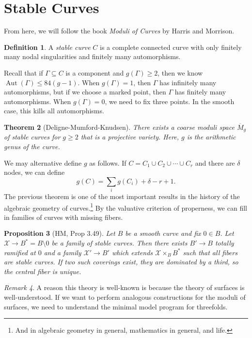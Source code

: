 \documentclass[leqno, openany]{memoir}
\newtheorem{thm}{Theorem}[section]
\newtheorem{prop}[thm]{Proposition}
\theoremstyle{definition}
\newtheorem{defn}[thm]{Definition}
\theoremstyle{remark}
\newtheorem{rmk}[thm]{Remark}
\theoremstyle{plain}
\theoremstyle{definition}
\theoremstyle{remark}
\newcommand{\mc}[1]{\mathcal{#1}}
\newcommand{\ol}[1]{\overline{#1}}
\DeclareMathOperator{\Aut}{Aut}
\begin{document}
\section{Stable Curves}%
\label{sec:stable_curves}

From here, we will follow the book \textit{Moduli of Curves} by Harris and Morrison.

\begin{defn}
    A \textit{stable curve} $C$ is a complete connected curve with only finitely many nodal singularities and finitely many automorphisms.
\end{defn}

Recall that if $\Gamma \subseteq C$ is a component and $g(\Gamma) \geq 2$, then we know $\Aut(\Gamma) \leq 84(g-1)$. When $g(\Gamma) = 1$, then $\Gamma$ has infinitely many automorphisms, but if we choose a marked point, then $\Gamma$ has finitely many automorphisms. When $g(\Gamma) = 0$, we need to fix three points. In the smooth case, this kills all automorphisms.

\begin{thm}[Deligne-Mumford-Knudsen]
    There exists a coarse moduli space $\ol{M}_g$ of stable curves for $g \geq 2$ that is a projective variety. Here, $g$ is the arithmetic genus of the curve.
\end{thm}

We may alternative define $g$ as follows. If $C = C_1 \cup C_2 \cup \cdots \cup C_r$ and there are $\delta$ nodes, we can define
\[ g(C) = \sum_i g(C_i) + \delta - r + 1. \]
The previous theorem is one of the most important results in the history of the algebraic geometry of curves.\footnote{And in algebraic geometry in general, mathematics in general, and life.} By the valuative criterion of properness, we can fill in families of curves with missing fibers.

\begin{prop}[HM, Prop 3.49]
    Let $B$ be a smooth curve and fix $0 \in B$. Let $\mc{X} \to B^* = B \setminus 0$ be a family of stable curves. Then there exists $B' \to B$ totally ramified at $0$ and a family $\mc{X}' \to B'$ which extends $\mc{X} \times_{B} B^*$ such that all fibers are stable curves. If two such coverings exist, they are dominated by a third, so the central fiber is unique.
\end{prop}

\begin{rmk}
    A reason this theory is well-known is because the theory of surfaces is well-understood. If we want to perform analogous constructions for the moduli of surfaces, we need to understand the minimal model program for threefolds.
\end{rmk}
\end{document}
